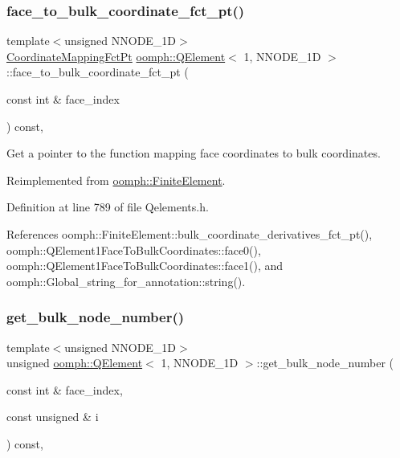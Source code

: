 \subsubsection{\texorpdfstring{face\+\_\+to\+\_\+bulk\+\_\+coordinate\+\_\+fct\+\_\+pt()}{face\_to\_bulk\_coordinate\_fct\_pt()}}
{\footnotesize\ttfamily template$<$unsigned N\+N\+O\+D\+E\+\_\+1D$>$ \\
\hyperlink{namespaceoomph_afa5c7a93cae1917e874b392601be0bde}{Coordinate\+Mapping\+Fct\+Pt} \hyperlink{classoomph_1_1QElement}{oomph\+::\+Q\+Element}$<$ 1, N\+N\+O\+D\+E\+\_\+1D $>$\+::face\+\_\+to\+\_\+bulk\+\_\+coordinate\+\_\+fct\+\_\+pt (\begin{DoxyParamCaption}\item[{const int \&}]{face\+\_\+index }\end{DoxyParamCaption}) const\hspace{0.3cm}{\ttfamily [inline]}, {\ttfamily [virtual]}}



Get a pointer to the function mapping face coordinates to bulk coordinates. 



Reimplemented from \hyperlink{classoomph_1_1FiniteElement_af20f05fb162a90b7d8ae175ec5dfab1a}{oomph\+::\+Finite\+Element}.



Definition at line 789 of file Qelements.\+h.



References oomph\+::\+Finite\+Element\+::bulk\+\_\+coordinate\+\_\+derivatives\+\_\+fct\+\_\+pt(), oomph\+::\+Q\+Element1\+Face\+To\+Bulk\+Coordinates\+::face0(), oomph\+::\+Q\+Element1\+Face\+To\+Bulk\+Coordinates\+::face1(), and oomph\+::\+Global\+\_\+string\+\_\+for\+\_\+annotation\+::string().

\mbox{\label{classoomph_1_1QElement_3_011_00_01NNODE__1D_01_4_a5a12cf6e4a14744a76662acfca274bdb}} 
\subsubsection{\texorpdfstring{get\+\_\+bulk\+\_\+node\+\_\+number()}{get\_bulk\_node\_number()}}
{\footnotesize\ttfamily template$<$unsigned N\+N\+O\+D\+E\+\_\+1D$>$ \\
unsigned \hyperlink{classoomph_1_1QElement}{oomph\+::\+Q\+Element}$<$ 1, N\+N\+O\+D\+E\+\_\+1D $>$\+::get\+\_\+bulk\+\_\+node\+\_\+number (\begin{DoxyParamCaption}\item[{const int \&}]{face\+\_\+index,  }\item[{const unsigned \&}]{i }\end{DoxyParamCaption}) const\hspace{0.3cm}{\ttfamily [inline]}, {\ttfamily [virtual]}}

